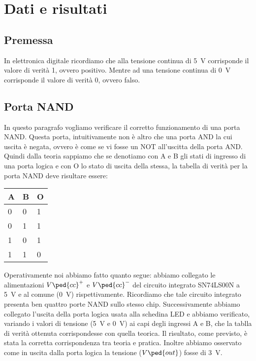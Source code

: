 \section*{Dati e risultati}

\subsection*{Premessa}

In elettronica digitale ricordiamo che alla tensione continua di \SI{+5}{\volt} corrisponde il valore di verità 1, ovvero positivo. Mentre ad una tensione continua di \SI{0}{\volt} corrisponde il valore di verità 0, ovvero falso.

\subsection*{Porta NAND}

In questo paragrafo vogliamo verificare il corretto funzionamento di una porta NAND. Questa porta, intuitivamente non è altro che una porta AND la cui uscita è negata, ovvero è come se vi fosse un NOT all'uscitta della porta AND.
Quindi dalla teoria sappiamo che se denotiamo con A e B gli stati di ingresso di una porta logica e con O lo stato di uscita della stessa, la tabella di verità per la porta NAND deve risultare essere:
\begin{center}
	\begin{tabular}{lll}
	\toprule
		A & B & O \\
	\midrule
		0 & 0 & 1 \\
		0 & 1 & 1 \\
		1 & 0 & 1 \\
		1 & 1 & 0 \\
	\bottomrule
	\end{tabular}
\end{center}
Operativamente noi abbiamo fatto quanto segue: abbiamo collegato le alimentazioni $V\ped{cc}^+$ e $V\ped{cc}^-$ del circuito integrato SN74LS00N a \SI{+5}{\volt} e al comune (\SI{0}{\volt}) rispettivamente. Ricordiamo che tale circuito integrato presenta ben quattro porte NAND sullo stesso chip. Successivamente abbiamo collegato l'uscita della porta logica usata alla schedina LED e abbiamo verificato, variando i valori di tensione (\SI{+5}{\volt} e \SI{0}{\volt}) ai capi degli ingressi A e B, che la tablla di verità ottenuta corrispondesse con quella teorica.
Il risultato, come previsto, è stata la corretta corrispondenza tra teoria e pratica. Inoltre abbiamo osservato come in uscita dalla porta logica la tensione ($V\ped{out}$) fosse di \SI{+3}{\volt}.

